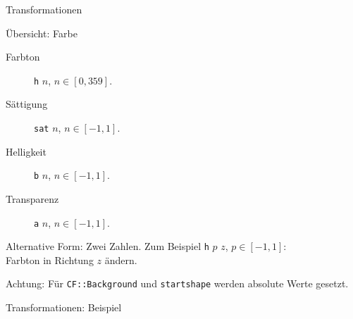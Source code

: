 \documentclass{beamer}
\theoremstyle{example}
\begin{document}
\begin{frame}{Transformationen}
\begin{block}{Übersicht: Farbe}
  \begin{description}
  \item[Farbton] \lstinline!h! {\small $n$}, $n\in [0,359]$. 
  \item[Sättigung] \lstinline!sat! {\small $n$}, $n\in [-1,1]$. 
  \item[Helligkeit] \lstinline!b! {\small $n$}, $n\in [-1,1]$.
  \item[Transparenz] \lstinline!a! {\small $n$}, $n\in [-1,1]$.
  \end{description}
\end{block}
Alternative Form: Zwei Zahlen. Zum Beispiel \lstinline!h! {\small $p$ $z$}, $p\in [-1,1]$:\\ Farbton in Richtung $z$ ändern.

\alert{Achtung:} Für \lstinline!CF::Background! und \lstinline!startshape! werden absolute Werte gesetzt.
\end{frame}

\begin{frame}{Transformationen: Beispiel}
  \begin{columns}
   \column{6cm}
   
   \column{4cm}
  \begin{center}
  \end{center} 
  \end{columns}   
\end{frame}
\end{document}

